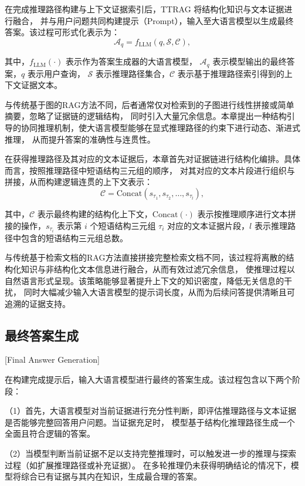 在完成推理路径构建与上下文证据索引后，TTRAG 将结构化知识与文本证据进行融合，
并与用户问题共同构建提示（Prompt），输入至大语言模型以生成最终答案。该过程可形式化表示为：
\begin{equation}
\mathcal{A}_q = f_{\text{LLM}}(q, \mathcal{S}, \mathcal{C}),
\end{equation}

\noindent 其中，$f_{\text{LLM}}(\cdot)$ 表示作为答案生成器的大语言模型，
$\mathcal{A}_q$ 表示模型输出的最终答案，$q$ 表示用户查询，
$\mathcal{S}$ 表示推理路径集合，$\mathcal{C}$ 表示基于推理路径索引得到的上下文证据文本。

与传统基于图的RAG方法不同，后者通常仅对检索到的子图进行线性拼接或简单摘要，忽略了证据链的逻辑结构，
同时引入大量冗余信息。本章提出一种结构引导的协同推理机制，使大语言模型能够在显式推理路径的约束下进行动态、渐进式推理，
从而提升答案的准确性与连贯性。

在获得推理路径及其对应的文本证据后，本章首先对证据链进行结构化编排。具体而言，按照推理路径中短语结构三元组的顺序，
对其对应的文本片段进行组织与拼接，从而构建逻辑连贯的上下文表示：
\begin{equation}
\mathcal{C} = \text{Concat}(s_{\tau_1}, s_{\tau_2}, \dots, s_{\tau_l}),
\end{equation}

\noindent 其中，$\mathcal{C}$ 表示最终构建的结构化上下文，$\text{Concat}(\cdot)$ 表示按推理顺序进行文本拼接的操作，$s_{\tau_i}$ 表示第 $i$ 个短语结构三元组 $\tau_i$ 对应的文本证据片段，$l$ 表示推理路径中包含的短语结构三元组总数。

与传统基于检索文档的RAG方法直接拼接完整检索文档不同，该过程将离散的结构化知识与非结构化文本信息进行融合，从而有效过滤冗余信息，
使推理过程以自然语言形式呈现。该策略能够显著提升上下文的知识密度，降低无关信息的干扰，
同时大幅减少输入大语言模型的提示词长度，从而为后续问答提供清晰且可追溯的证据支持。

\subsection{最终答案生成}[Final Answer Generation]

在构建完成提示后，输入大语言模型进行最终的答案生成。该过程包含以下两个阶段：

（1）首先，大语言模型对当前证据进行充分性判断，即评估推理路径与文本证据是否能够完整回答用户问题。当证据充足时，
模型基于结构化推理路径生成一个全面且符合逻辑的答案。

（2）当模型判断当前证据不足以支持完整推理时，可以触发进一步的推理与探索过程（如扩展推理路径或补充证据）。
在多轮推理仍未获得明确结论的情况下，模型将综合已有证据与其内在知识，生成最合理的答案。

